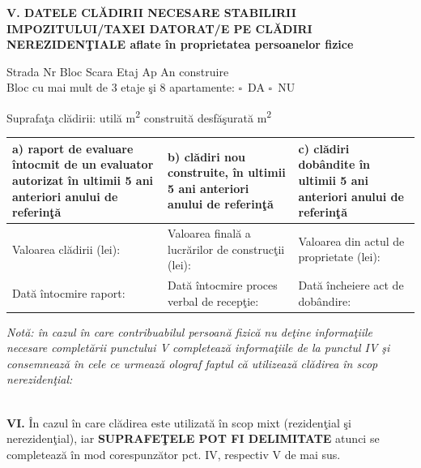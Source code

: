 \documentclass[10pt,a4paper]{article}
\newcommand{\fillline}[1][6cm]{\underline{\hspace{#1}}}
\newcommand{\checkboxempty}{$\square$}
\begin{document}
\vspace{0.4cm}

\textbf{V. DATELE CLĂDIRII NECESARE STABILIRII IMPOZITULUI/TAXEI DATORAT/E PE CLĂDIRI NEREZIDENŢIALE aflate în proprietatea persoanelor fizice}

\vspace{0.2cm}

Strada \fillline[4cm] Nr \fillline[1.5cm] Bloc \fillline[1cm] Scara \fillline[1cm] Etaj \fillline[1cm] Ap \fillline[1cm] An construire \fillline[2cm]\\
Bloc cu mai mult de 3 etaje şi 8 apartamente: \checkboxempty\ DA \quad \checkboxempty\ NU

\vspace{0.2cm}

Suprafaţa clădirii: utilă \fillline[2cm] m\textsuperscript{2} \quad construită desfăşurată \fillline[2cm] m\textsuperscript{2}

\vspace{0.3cm}

\begin{tabularx}{\textwidth}{|X|X|X|}
\hline
\textbf{a)} raport de evaluare întocmit de un evaluator autorizat în ultimii 5 ani anteriori anului de referinţă & \textbf{b)} clădiri nou construite, în ultimii 5 ani anteriori anului de referinţă & \textbf{c)} clădiri dobândite în ultimii 5 ani anteriori anului de referinţă \\
\hline
Valoarea clădirii (lei): \fillline[3cm] & Valoarea finală a lucrărilor de construcţii (lei): \fillline[3cm] & Valoarea din actul de proprietate (lei): \fillline[3cm] \\
\hline
Dată întocmire raport: \fillline[3cm] & Dată întocmire proces verbal de recepţie: \fillline[3cm] & Dată încheiere act de dobândire: \fillline[3cm] \\
\hline
\end{tabularx}

\vspace{0.2cm}

\textit{Notă: în cazul în care contribuabilul persoană fizică nu deţine informaţiile necesare completării punctului V completează informaţiile de la punctul IV şi consemnează în cele ce urmează olograf faptul că utilizează clădirea în scop nerezidenţial:}\\
\hrulefill\\
\hrulefill

\vspace{0.4cm}

\textbf{VI.} În cazul în care clădirea este utilizată în scop mixt (rezidenţial şi nerezidenţial), iar \textbf{SUPRAFEŢELE POT FI DELIMITATE} atunci se completează în mod corespunzător pct. IV, respectiv V de mai sus.
\end{document}
